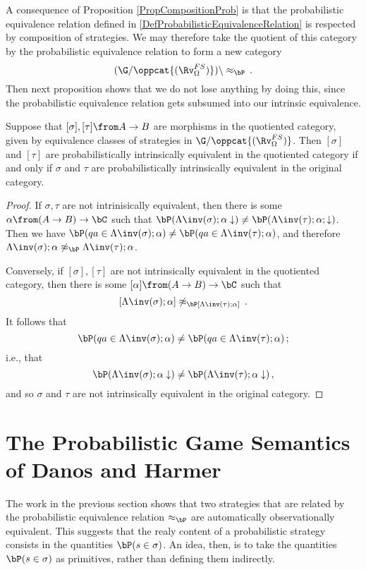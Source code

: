 A consequence of Proposition \ref{PropCompositionProb} is that the probabilistic equivalence relation defined in \ref{DefProbabilisticEquivalenceRelation} is respected by composition of strategies.
We may therefore take the quotient of this category by the probabilistic equivalence relation to form a new category
\[
  (\G/\oppcat{(\Rv_{\Omega}^{FS})})\char`\\\approx_\bP\,.
  \]
Then next proposition shows that we do not lose anything by doing this, since the probabilistic equivalence relation gets subsumed into our intrinsic equivalence.

\begin{proposition}
  Suppose that $[\sigma],[\tau]\from A \to B$ are morphisms in the quotiented category, given by equivalence classes of strategies in $\G/\oppcat{(\Rv_\Omega^{FS})}$.
  Then $[\sigma]$ and $[\tau]$ are probabilistically intrinsically equivalent in the quotiented category if and only if $\sigma$ and $\tau$ are probabilistically intrinsically equivalent in the original category.
\end{proposition}
\begin{proof}
  If $\sigma,\tau$ are not intrinisically equivalent, then there is some $\alpha\from(A \to B) \to \bC$ such that $\bP(\Lambda\inv(\sigma);\alpha\downarrow)\ne\bP(\Lambda\inv(\tau);\alpha;\downarrow)$.
  Then we have $\bP(qa\in\Lambda\inv(\sigma);\alpha) \ne \bP(qa\in\Lambda\inv(\tau);\alpha)$, and therefore $\Lambda\inv(\sigma);\alpha\not\approx_{\bP}\Lambda\inv(\tau);\alpha$.

  Conversely, if $[\sigma],[\tau]$ are not intrinsically equivalent in the quotiented category, then there is some $[\alpha]\from (A \to B) \to \bC$ such that
  \[
    [\Lambda\inv(\sigma);\alpha] \not\approx_\bP [\Lambda\inv(\tau);\alpha]\,.
    \]
  It follows that
  \[
    \bP(qa\in\Lambda\inv(\sigma);\alpha) \ne \bP(qa\in\Lambda\inv(\tau);\alpha)\,;
    \]
  i.e., that
  \[
    \bP(\Lambda\inv(\sigma);\alpha\downarrow) \ne \bP(\Lambda\inv(\tau);\alpha\downarrow)\,,
    \]
  and so $\sigma$ and $\tau$ are not intrinsically equivalent in the original category.
\end{proof}

\section{The Probabilistic Game Semantics of Danos and Harmer}

The work in the previous section shows that two strategies that are related by the probabilistic equivalence relation $\approx_\bP$ are automatically observationally equivalent.  
This suggests that the realy content of a probabilistic strategy consists in the quantities $\bP(s\in\sigma)$.  
An idea, then, is to take the quantities $\bP(s\in\sigma)$ as primitives, rather than defining them indirectly.

